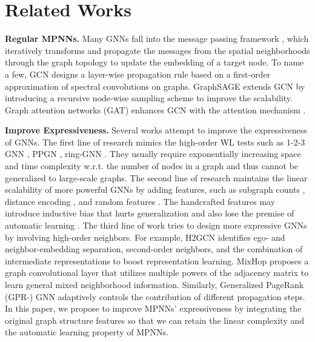 \documentclass{article}
\theoremstyle{plain}
\begin{document}
\section{Related Works}
\label{sec:Related}
\textbf{Regular MPNNs.} Many GNNs \cite{niepert2016learning,hamilton2017inductive,monti2017geometric,velivckovic2017graph,gao2018large,xu2018powerful,wang2019dynamic} fall into the message passing framework \cite{gilmer2017neural,battaglia2018relational}, which iteratively transforms and propagate the messages from the spatial neighborhoods through the graph topology to update the embedding of a target node.
To name a few, GCN \cite{kipf2016semi} designs a layer-wise propagation rule based on a first-order approximation of spectral convolutions on graphs. 
GraphSAGE \cite{hamilton2017inductive} extends GCN by introducing a recursive node-wise sampling scheme to improve the scalability. 
Graph attention networks (GAT) \cite{velivckovic2017graph}  enhances GCN with the attention mechanism \cite{vaswani2017attention}.

\textbf{Improve Expressiveness.}
Several works attempt to improve the expressiveness of GNNs.
The first line of research mimics the high-order WL tests such as 1-2-3 GNN \cite{morris2019weisfeiler}, PPGN \cite{maron2019provably}, ring-GNN \cite{chen2019equivalence}. They usually require exponentially increasing space and time complexity w.r.t. the number of nodes in a graph and thus cannot be generalized to large-scale graphs. 
The second line of research maintains the linear scalability of more powerful GNNs by adding features, such as subgraph counts \cite{bouritsas2022improving}, distance encoding \cite{li2020distance}, and random features \cite{abboud2020surprising,sato2021random}. 
The handcrafted features may introduce inductive bias that hurts generalization and also lose the premise of automatic learning \cite{zhao2021stars}.
The third line of work tries to design more expressive GNNs by involving high-order neighbors.
For example, H2GCN \cite{zhu2020beyond} identifies ego- and neighbor-embedding separation, second-order neighbors, and the combination of intermediate representations to boost representation learning.
MixHop \cite{abu2019mixhop} proposes a graph convolutional layer that utilizes multiple powers of the adjacency matrix to learn general mixed neighborhood information.
Similarly, Generalized PageRank (GPR-) GNN \cite{chien2020adaptive} adaptively controls the contribution of different propagation steps.
In this paper, we propose to improve MPNNs' expressiveness by integrating the original graph structure features so that we can retain the linear complexity and the automatic learning property of MPNNs.
\end{document}
